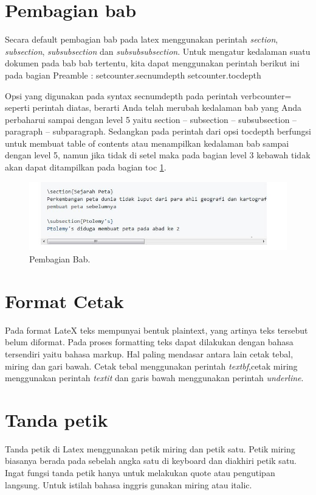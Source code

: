 \section{Pembagian bab}
Secara default pembagian bab pada latex menggunakan perintah \textit{section}, \textit{subsection}, \textit{subsubsection} dan \textit{subsubsubsection}. Untuk mengatur kedalaman suatu dokumen pada bab bab tertentu, kita dapat menggunakan perintah berikut ini pada bagian Preamble :
setcounter.secnumdepth
setcounter.tocdepth



Opsi yang digunakan pada syntax secnumdepth pada perintah verbcounter= seperti perintah diatas, berarti Anda telah merubah kedalaman bab yang Anda perbaharui sampai dengan level 5 yaitu section -- subsection -- subsubsection -- paragraph -- subparagraph. Sedangkan pada perintah dari opsi tocdepth berfungsi untuk membuat table of contents atau menampilkan kedalaman bab sampai dengan level 5, namun jika tidak di setel maka pada bagian level 3 kebawah tidak akan dapat ditampilkan pada bagian toc \ref{labelgambar}.


\begin{figure}[ht]
\centerline{\includegraphics[width=1\textwidth]{figures/capture.JPG}}
\caption{Pembagian Bab.}
\label{labelgambar}
\end{figure}



\section{Format Cetak}
Pada format LateX teks mempunyai bentuk plaintext, yang artinya teks tersebut belum diformat. Pada proses formatting teks dapat dilakukan dengan bahasa tersendiri yaitu bahasa markup. Hal paling mendasar antara lain cetak tebal, miring dan gari bawah. Cetak tebal menggunakan perintah \textit{textbf},cetak miring menggunakan perintah \textit{textit} dan garis bawah menggunakan perintah \textit{underline}.

\section{Tanda petik}
Tanda petik di Latex menggunakan petik miring dan petik satu. Petik miring biasanya berada pada sebelah angka satu di keyboard dan diakhiri petik satu. Ingat fungsi tanda petik hanya untuk melakukan quote atau pengutipan langsung. Untuk istilah bahasa inggris gunakan miring atau italic.

